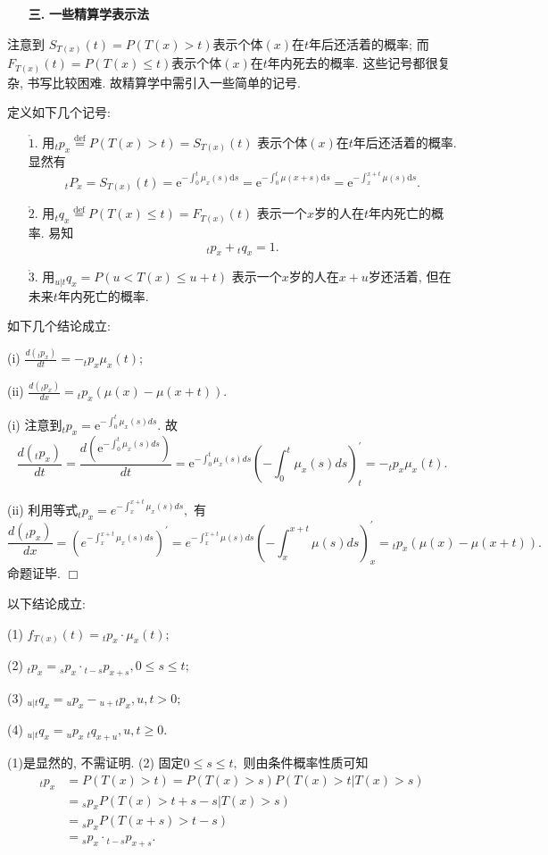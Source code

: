 \documentclass[a4paper,10pt]{ctexbook}
\newcommand{\hei}{\CJKfamily{hei}}      %
\def\qed{\hfill$\Box$\medskip}
\begin{document}
\begin{itemize}
    \item[{\bf\hei 三.}]{\bf\hei 一些精算学表示法}
\end{itemize}
注意到 $ S_{T(x)}(t)=P(T(x)>t)$表示个体$ (x)$在$t$年后还活着的概率; 而$F_{T(x)}(t)=P(T(x)\le t)$表示个体$(x)$在$t$年内死去的概率. 这些记号都很复杂, 书写比较困难. 故精算学中需引入一些简单的记号.


定义如下几个记号:
\begin{enumerate}
    \item[$\mathring 1.$] 用$_tp_{x}\stackrel{\text{def}}{=}P(T(x)>t)=S_{T(x)}(t)$
        表示个体$(x)$在$t$年后还活着的概率. 显然有
        $$ {}_tP_x=S_{T(x)}(t)=\mathrm{e}^{-\int_{0}^{t}\mu_x(s)\mathrm{d}s}=\mathrm{e}^{-\int_{0}^{t}\mu(x+s)\mathrm{d}s}=\mathrm{e}^{-\int_{x}^{x+t}\mu(s)\mathrm{d}s}.$$
    \item[$\mathring 2.$] 用$_tq_{x}\stackrel{\text{def}}{=}P(T(x)\leq t)=F_{T(x)}(t)$
        表示一个$x$岁的人在$t$年内死亡的概率. 易知
        $$_tp_{x}+{}_tq_{x}=1.$$
    \item[$\mathring 3.$] 用$ _{u|t}q_x=P(u<T(x)\leq u+t)$
        表示一个$x$岁的人在$x+u$岁还活着, 但在未来$t$年内死亡的概率.
\end{enumerate}
\begin{proposition}如下几个结论成立:

    (i) $\frac{d(_tp_x)}{dt}=-_tp_x\mu_x(t);$

    (ii) $\frac{d(_tp_x)}{dx}= {}_tp_x(\mu(x)-\mu(x+t)).$


\end{proposition}

\proof (i) 注意到${}_tp_x=\mathrm{e}^{-\int_{0}^{t}\mu_x(s)ds}.$ 故
$$\frac{d(_tp_x)}{dt}=\frac{d(\mathrm{e}^{-\int_{0}^{t}\mu_x(s)ds})}{dt}=\mathrm{e}^{-\int_{0}^{t}\mu_x(s)ds}({-\int_{0}^{t}\mu_x(s)ds})^{\prime}_t=-_tp_x\mu_x(t).$$

(ii) 利用等式${}_tp_x=e^{-\int_{x}^{x+t}\mu_x(s)ds},$ 有
$$\frac{d(_tp_x)}{dx}=(e^{-\int_{x}^{x+t}\mu_x(s)ds})^{\prime}=e^{-\int_{x}^{x+t}\mu(s)ds}({-\int_{x}^{x+t}\mu(s)ds})^{\prime}_x= {}_tp_x(\mu(x)-\mu(x+t)).$$
命题证毕.
\qed

\begin{proposition}以下结论成立:

    (1) $f_{T(x)}(t)={}_tp_x\cdot \mu_x(t);$

    (2) $_tp_x={}_sp_x\cdot{}_{t-s}p_{x+s},0\leq s\leq t;$

    (3) ${}_{u|t}q_x={}_up_x-{}_{u+t}p_x, u,t>0;$

    (4) ${}_{u|t}q_x={}_up_x~{}_{t}q_{x+u},u,t\ge0.$
\end{proposition}
\proof (1)是显然的, 不需证明. (2)
固定$0\le s\le t,$ 则由条件概率性质可知
\begin{align*}
    {}_tp_x & =P(T(x)>t)=P(T(x)>s)P(T(x)>t|T(x)>s) \\
            & ={}_sp_xP(T(x)>t+s-s|T(x)>s)         \\
            & ={}_sp_xP(T(x+s)>t-s)                \\
            & ={}_sp_x\cdot{}_{t-s}p_{x+s}.\end{align*}
\end{document}
